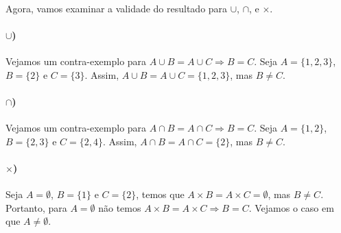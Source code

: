 \documentclass[9pt,twocolumn,a4paper]{article}
\begin{document}
    \paragraph{}
    Agora, vamos examinar a validade do resultado para $\cup$, $\cap$, e $\times$.

    \paragraph{$\cup$)}
    Vejamos um contra-exemplo para $A \cup B = A \cup C \Rightarrow B = C$. Seja $A = \{1, 2, 3\}$, $B = \{2\}$ e $C = \{3\}$. Assim, $A \cup B = A \cup C = \{1, 2, 3\}$, mas $B \not= C$.

    \paragraph{$\cap$)}
    Vejamos um contra-exemplo para $A \cap B = A \cap C \Rightarrow B = C$. Seja $A = \{1, 2\}$, $B = \{2, 3\}$ e $C = \{2, 4\}$. Assim, $A \cap B = A \cap C = \{2\}$, mas $B \not= C$.

    \paragraph{$\times$)}
    Seja $A = \emptyset$, $B = \{1\}$ e $C = \{2\}$, temos que $A \times B = A \times C = \emptyset$, mas $B \not= C$. Portanto, para $A = \emptyset$ não temos $A \times B = A \times C \Rightarrow B = C$. Vejamos o caso em que $A \not= \emptyset$.
\end{document}

